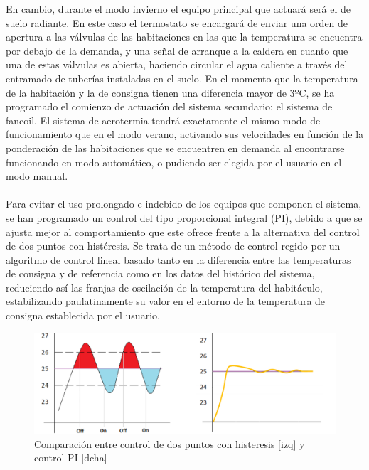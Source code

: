 \begin{itemize}
En cambio, durante el modo invierno el equipo principal que actuará será el de suelo radiante. En este caso el termostato se encargará de enviar una orden de apertura a las válvulas de las habitaciones en las que la temperatura se encuentra por debajo de la demanda, y una señal de arranque a la caldera en cuanto que una de estas válvulas es abierta, haciendo circular el agua caliente a través del entramado de tuberías instaladas en el suelo. En el momento que la temperatura de la habitación y la de consigna tienen una diferencia mayor de 3ºC, se ha programado el comienzo de actuación del sistema secundario: el sistema de fancoil. El sistema de aerotermia tendrá exactamente el mismo modo de funcionamiento que en el modo verano, activando sus velocidades en función de la ponderación de las habitaciones que se encuentren en demanda al encontrarse funcionando en modo automático, o pudiendo ser elegida por el usuario en el modo manual. \\\\
Para evitar el uso prolongado e indebido de los equipos que componen el sistema, se han programado un control del tipo proporcional integral (PI), debido a que se ajusta mejor al comportamiento que este ofrece frente a la alternativa del control de dos puntos con histéresis. Se trata de un método de control regido por un algoritmo de control lineal basado tanto en la diferencia entre las temperaturas de consigna y de referencia como en los datos del histórico del sistema, reduciendo así las franjas de oscilación de la temperatura del habitáculo, estabilizando paulatinamente su valor en el entorno de la temperatura de consigna establecida por el usuario. 
\begin{figure}[h]
\includegraphics[width=1.15\textwidth]{figures/metodos_control.png}   
\caption{Comparación entre control de dos puntos con histeresis [izq] y control PI [dcha]}
\label{fig:metodos_control}
\end{figure}

\end{itemize}
